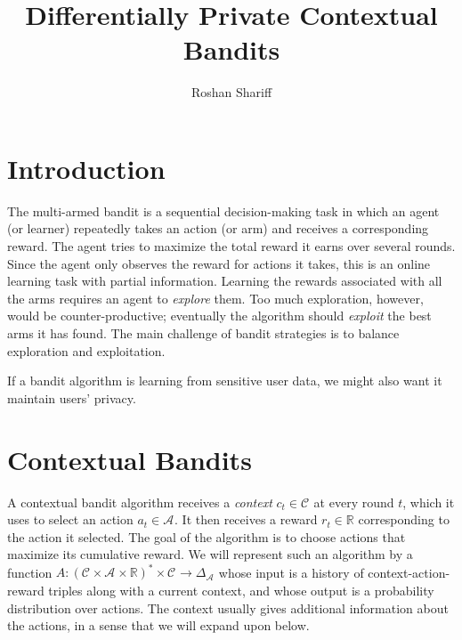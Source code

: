 \documentclass{article}
\title{Differentially Private Contextual Bandits}
\author{Roshan Shariff}
\newcommand{\Real}{\mathds{R}}
\DeclarePairedDelimiter{\paren}()
\newcommand{\Aset}[1]{\mathcal{A}_{#1}}
\newcommand{\Cset}[1]{\mathcal{C}_{#1}}
\begin{document}
\maketitle


\section{Introduction}

The multi-armed bandit is a sequential decision-making task in which
an agent (or learner) repeatedly takes an action (or arm) and receives
a corresponding reward.  The agent tries to maximize the total reward
it earns over several rounds.  Since the agent only observes the
reward for actions it takes, this is an online learning task with
partial information.  Learning the rewards associated with all the
arms requires an agent to \emph{explore} them.  Too much exploration,
however, would be counter-productive; eventually the algorithm should
\emph{exploit} the best arms it has found.  The main challenge of
bandit strategies is to balance exploration and exploitation.

If a bandit algorithm is learning from sensitive user data, we might
also want it maintain users' privacy.



\section{Contextual Bandits}

A contextual bandit algorithm receives a \emph{context}
$c_t\in\Cset{}$ at every round $t$, which it uses to select an action
$a_t\in\Aset{}$.  It then receives a reward $r_t\in\Real$
corresponding to the action it selected.  The goal of the algorithm is
to choose actions that maximize its cumulative reward.  We will
represent such an algorithm by a function
$A : (\Cset{}\times\Aset{}\times\Real)^* \times \Cset{} \to
\Delta_{\Aset{}}$ whose input is a history of context-action-reward
triples along with a current context, and whose output is a
probability distribution over actions.  The context usually gives
additional information about the actions, in a sense that we will
expand upon below.
\end{document}
